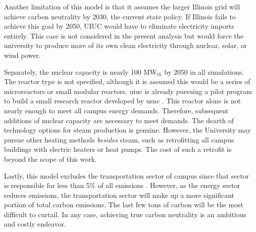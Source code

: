 Another limitation of this model is that it assumes the larger Illinois grid will
achieve carbon neutrality by 2030, the current state policy. If Illinois fails to
achieve this goal by 2050, UIUC would have to eliminate electricity imports entirely.
This case is not considered in the present analysis but would force the university
to produce more of its own clean electricity through nuclear, solar, or wind power.

Separately, the nuclear capacity is nearly 100 MW$_{th}$ by 2050 in all simulations.
The reactor type is not specified, although it is assumed this would be a series
of microreactors or small modular reactors. \gls{uiuc} is already pursuing a pilot
program to build a small
research reactor developed by \gls{usnc} \cite{noauthor_university_2021}. This reactor
alone is not nearly enough to meet all campus energy demands. Therefore, subsequent
additions of nuclear capacity are necessary to meet demands. The dearth of
technology options for steam production is genuine. However, the University may
pursue other heating methods \textit{besides} steam, such as retrofitting all
campus buildings with electric heaters or heat pumps. The cost of such a retrofit
is beyond the scope of this work.

Lastly, this model excludes the transportation sector of campus since that sector
is responsible for less than 5\% of all emissions
\cite{institute_for_sustainability_energy_and_environment_illinois_2020}. However,
as the energy sector reduces emissions, the transportation sector will make up a
more significant portion of total carbon emissions. The last few tons of carbon
will be the most difficult to curtail. In any case, achieving true carbon
neutrality is an ambitious and costly endeavor.
